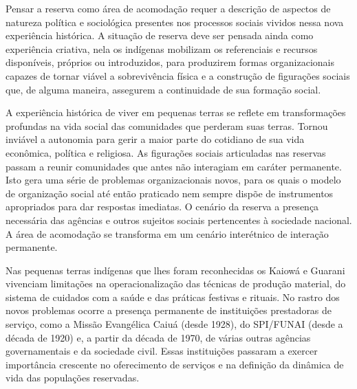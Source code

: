 \documentclass{article}
\begin{document}
Pensar a reserva como \'area de acomoda\c{c}\~ao requer a
descri\c{c}\~ao de aspectos de natureza pol\'itica e sociol\'ogica
presentes nos processos sociais vividos nessa nova experi\^encia
hist\'orica. A situa\c{c}\~ao de reserva deve ser pensada ainda como
experi\^encia criativa, nela os ind\'igenas mobilizam os referenciais e
recursos dispon\'iveis, pr\'oprios ou introduzidos, para produzirem
formas organizacionais capazes de tornar vi\'avel a sobreviv\^encia
f\'isica e a constru\c{c}\~ao de figura\c{c}\~oes sociais que, de
alguma maneira, assegurem a continuidade de sua forma\c{c}\~ao social. 

A experi\^encia hist\'orica de viver em pequenas terras se reflete em
transforma\c{c}\~oes profundas na vida social das comunidades que
perderam suas terras. Tornou invi\'avel a autonomia para gerir a maior
parte do cotidiano de sua vida econ\^omica, pol\'itica e religiosa. As
figura\c{c}\~oes sociais articuladas nas reservas passam a reunir
comunidades que antes n\~ao interagiam em car\'ater permanente. Isto
gera uma s\'erie de problemas organizacionais novos, para os quais o
modelo de organiza\c{c}\~ao social at\'e ent\~ao praticado nem sempre
disp\~oe de instrumentos apropriados para dar respostas imediatas. O
cen\'ario da reserva a presen\c{c}a necess\'aria das ag\^encias e
outros sujeitos sociais pertencentes \`a sociedade nacional. A \'area
de acomoda\c{c}\~ao se transforma em um cen\'ario inter\'etnico de
intera\c{c}\~ao permanente.

Nas pequenas terras ind\'igenas que lhes foram reconhecidas os Kaiow\'a
e Guarani vivenciam limita\c{c}\~oes na operacionaliza\c{c}\~ao das
t\'ecnicas de produ\c{c}\~ao material, do sistema de cuidados com a
sa\'ude e das pr\'aticas festivas e rituais. No rastro dos novos
problemas ocorre a presen\c{c}a permanente de institui\c{c}\~oes
prestadoras de servi\c{c}o, como a Miss\~ao Evang\'elica Caiu\'a (desde
1928), do SPI/FUNAI (desde a d\'ecada de 1920) e, a partir da d\'ecada
de 1970, de v\'arias outras ag\^encias governamentais e da sociedade
civil. Essas institui\c{c}\~oes passaram a exercer import\^ancia
crescente no oferecimento de servi\c{c}os e na defini\c{c}\~ao da
din\^amica de vida das popula\c{c}\~oes reservadas.
\end{document}

